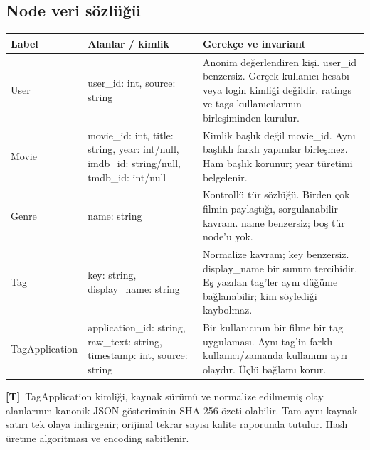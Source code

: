 \documentclass[11pt,a4paper]{article}
\newcommand{\design}{\textbf{[T]}}
\begin{document}
\subsection{Node veri sözlüğü}
\small
\begin{longtable}{@{}P{25mm}P{53mm}P{72mm}@{}}\toprule
\textbf{Label} & \textbf{Alanlar / kimlik} & \textbf{Gerekçe ve invariant}\\\midrule\endhead
User & user\_id: int, source: string & Anonim değerlendiren kişi. user\_id benzersiz. Gerçek kullanıcı hesabı veya login kimliği değildir. ratings ve tags kullanıcılarının birleşiminden kurulur.\\
Movie & movie\_id: int, title: string, year: int/null, imdb\_id: string/null, tmdb\_id: int/null & Kimlik başlık değil movie\_id. Aynı başlıklı farklı yapımlar birleşmez. Ham başlık korunur; year türetimi belgelenir.\\
Genre & name: string & Kontrollü tür sözlüğü. Birden çok filmin paylaştığı, sorgulanabilir kavram. name benzersiz; boş tür node'u yok.\\
Tag & key: string, display\_name: string & Normalize kavram; key benzersiz. display\_name bir sunum tercihidir. Eş yazılan tag'ler aynı düğüme bağlanabilir; kim söylediği kaybolmaz.\\
TagApplication & application\_id: string, raw\_text: string, timestamp: int, source: string & Bir kullanıcının bir filme bir tag uygulaması. Aynı tag'in farklı kullanıcı/zamanda kullanımı ayrı olaydır. Üçlü bağlamı korur.\\\bottomrule
\end{longtable}\normalsize

\design\ TagApplication kimliği, kaynak sürümü ve normalize edilmemiş olay alanlarının kanonik JSON gösteriminin SHA-256 özeti olabilir. Tam aynı kaynak satırı tek olaya indirgenir; orijinal tekrar sayısı kalite raporunda tutulur. Hash üretme algoritması ve encoding sabitlenir.
\end{document}
